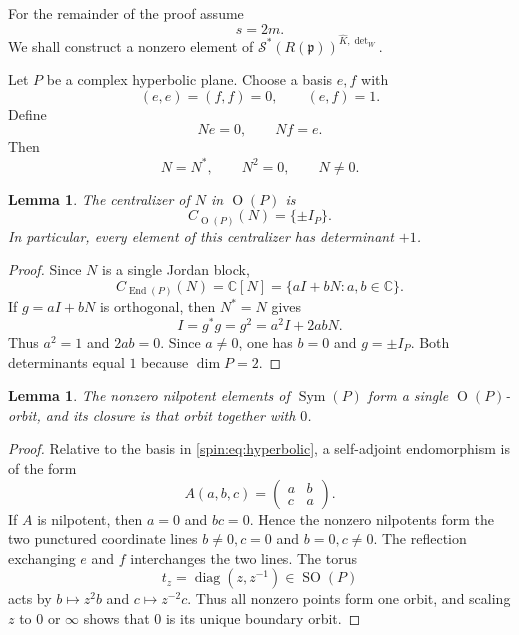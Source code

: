 \documentclass[10pt,a4paper]{amsart}
\numberwithin{equation}{section}
\newtheorem{lemma}[theorem]{Lemma}
\newcommand{\C}{\mathbb C}
\newcommand{\SO}{\operatorname{SO}}
\newcommand{\Or}{\operatorname{O}}
\newcommand{\Sym}{\operatorname{Sym}}
\newcommand{\End}{\operatorname{End}}
\newcommand{\diag}{\operatorname{diag}}
\newcommand{\fp}{\mathfrak p}
\newcommand{\cS}{\mathcal S}
\begin{document}
For the remainder of the proof assume
\begin{equation}\label{spin:eq:s-even}
  s=2m.
\end{equation}
We shall construct a nonzero element of
$\cS^*(R(\fp))^{\widehat K,\det_W}$.

Let $P$ be a complex hyperbolic plane.  Choose a basis $e,f$ with
\begin{equation}\label{spin:eq:hyperbolic}
  (e,e)=(f,f)=0,
  \qquad
  (e,f)=1.
\end{equation}
Define
\begin{equation}\label{spin:eq:Nranktwo}
  Ne=0,
  \qquad
  Nf=e.
\end{equation}
Then
\[
  N=N^*,
  \qquad
  N^2=0,
  \qquad
  N\ne0.
\]

\begin{lemma}\label{spin:lem:ranktwo-centralizer}
The centralizer of $N$ in $\Or(P)$ is
\[
  C_{\Or(P)}(N)=\{\pm I_P\}.
\]
In particular, every element of this centralizer has determinant $+1$.
\end{lemma}

\begin{proof}
Since $N$ is a single Jordan block,
\[
  C_{\End(P)}(N)=\C[N]=\{aI+bN:a,b\in\C\}.
\]
If $g=aI+bN$ is orthogonal, then $N^*=N$ gives
\[
  I=g^*g=g^2=a^2I+2abN.
\]
Thus $a^2=1$ and $2ab=0$.  Since $a\ne0$, one has $b=0$ and
$g=\pm I_P$.  Both determinants equal $1$ because $\dim P=2$.
\end{proof}

\begin{lemma}\label{spin:lem:ranktwo-orbit}
The nonzero nilpotent elements of $\Sym(P)$ form a single $\Or(P)$-orbit, and
its closure is that orbit together with $0$.
\end{lemma}

\begin{proof}
Relative to the basis in \eqref{spin:eq:hyperbolic}, a self-adjoint endomorphism is
of the form
\[
  A(a,b,c)=
  \begin{pmatrix}
    a&b\\ c&a
  \end{pmatrix}.
\]
If $A$ is nilpotent, then $a=0$ and $bc=0$.  Hence the nonzero nilpotents form
the two punctured coordinate lines $b\ne0,c=0$ and $b=0,c\ne0$.  The
reflection exchanging $e$ and $f$ interchanges the two lines.  The torus
\[
  t_z=\diag(z,z^{-1})\in\SO(P)
\]
acts by $b\mapsto z^2b$ and $c\mapsto z^{-2}c$.  Thus all nonzero points form
one orbit, and scaling $z$ to $0$ or $\infty$ shows that $0$ is its unique
boundary orbit.
\end{proof}
\end{document}
